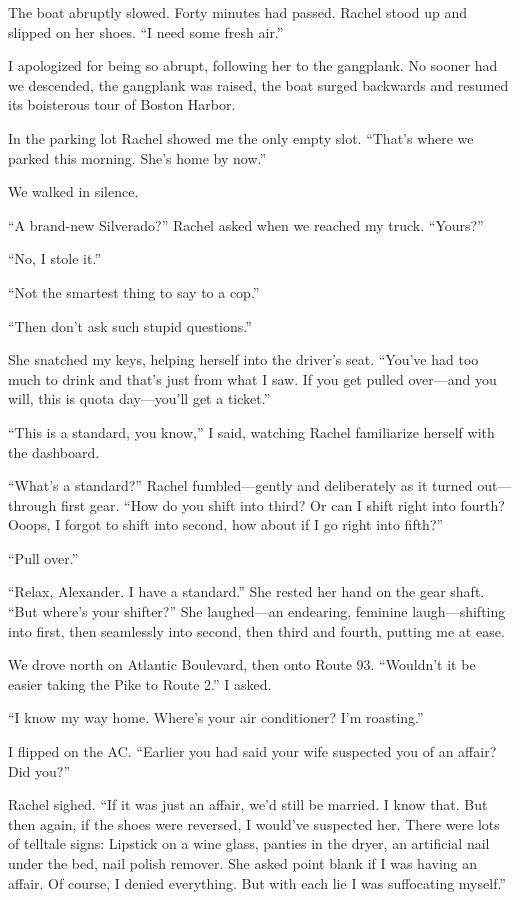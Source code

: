 The boat abruptly slowed. Forty minutes had passed. Rachel stood up and
slipped on her shoes. ``I need some fresh air.''

I apologized for being so abrupt, following her to the gangplank. No
sooner had we descended, the gangplank was raised, the boat surged
backwards and resumed its boisterous tour of Boston Harbor.

In the parking lot Rachel showed me the only empty slot. ``That's where
we parked this morning. She's home by now.''

We walked in silence.

``A brand-new Silverado?'' Rachel asked when we reached my truck.
``Yours?''

``No, I stole it.''

``Not the smartest thing to say to a cop.''

``Then don't ask such stupid questions.''

She snatched my keys, helping herself into the driver's seat. ``You've
had too much to drink and that's just from what I saw. If you get pulled
over---and you will, this is quota day---you'll get a ticket.''

``This is a standard, you know,'' I said, watching Rachel familiarize
herself with the dashboard.

``What's a standard?'' Rachel fumbled---gently and deliberately as it
turned out---through first gear. ``How do you shift into third? Or can I
shift right into fourth? Ooops, I forgot to shift into second, how about
if I go right into fifth?''

``Pull over.''

``Relax, Alexander. I have a standard.'' She rested her hand on the gear
shaft. ``But where's your shifter?'' She laughed---an endearing,
feminine laugh---shifting into first, then seamlessly into second, then
third and fourth, putting me at ease.

We drove north on Atlantic Boulevard, then onto Route 93. \linebreak ``Wouldn't it
be easier taking the Pike to Route 2.'' I asked.

``I know my way home. Where's your air conditioner? I'm roasting.''

I flipped on the AC. ``Earlier you had said your wife suspected you of
an affair? Did you?''

Rachel sighed. ``If it was just an affair, we'd still be married. I know
that. But then again, if the shoes were reversed, I would've suspected
her. There were lots of telltale signs: Lipstick on a wine glass,
panties in the dryer, an artificial nail under the bed, nail polish
remover. She asked point blank if I was having an affair. Of course, I
denied everything. But with each lie I was suffocating myself.''

